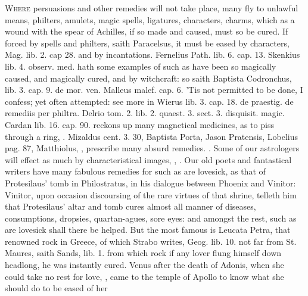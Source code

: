 \lettrine{W}{here} persuasions and other remedies will not take place, many fly to
unlawful means, philters, amulets, magic spells, ligatures, characters,
charms, which as a wound with the spear of Achilles, if so made and
caused, must so be cured. If forced by spells and philters, saith
Paracelsus, it must be eased by characters, Mag. lib. 2. cap 28. and by
incantations. Fernelius Path. lib. 6. cap. 13. Skenkius lib. 4.
observ. med. hath some examples of such as have been so magically
caused, and magically cured, and by witchcraft: so saith Baptista
Codronchus, lib. 3. cap. 9. de mor. ven. Malleus malef. cap. 6. 'Tis
not permitted to be done, I confess; yet often attempted: see more in
Wierus lib. 3. cap. 18. de praestig. de remediis per philtra. Delrio
tom. 2. lib. 2. quaest. 3. sect. 3. disquisit. magic. Cardan lib. 16.
cap. 90. reckons up many magnetical medicines, as to piss through a
ring, \etc{}. Mizaldus cent. 3. 30, Baptista Porta, Jason Pratensis,
Lobelius pag. 87, Matthiolus, \etc{}, prescribe many absurd remedies.
. Some of our astrologers will
effect as much by characteristical images, , \etc{}. Our
old poets and fantastical writers have many fabulous remedies for such
as are lovesick, as that of Protesilaus' tomb in Philostratus, in his
dialogue between Phoenix and Vinitor: Vinitor, upon occasion
discoursing of the rare virtues of that shrine, telleth him that
Protesilaus' altar and tomb cures almost all manner of diseases,
consumptions, dropsies, quartan-agues, sore eyes: and amongst the rest,
such as are lovesick shall there be helped. But the most famous is
Leucata Petra, that renowned rock in Greece, of which Strabo
writes, Geog. lib. 10. not far from St. Maures, saith Sands, lib. 1.
from which rock if any lover flung himself down headlong, he was
instantly cured. Venus after the death of Adonis, when she could take
no rest for love, , came
to the temple of Apollo to know what she should do to be eased of her
